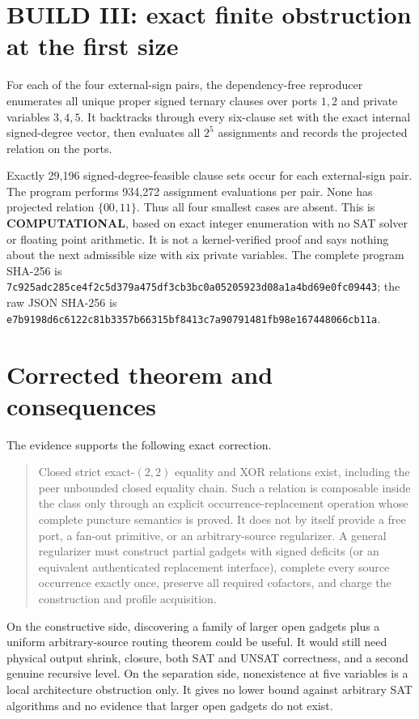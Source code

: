 \documentclass[11pt]{article}
\newcommand{\COMP}{\textbf{COMPUTATIONAL}}
\begin{document}
\section{BUILD III: exact finite obstruction at the first size}
For each of the four external-sign pairs, the dependency-free reproducer
enumerates all unique proper signed ternary clauses over ports $1,2$ and
private variables $3,4,5$. It backtracks through every six-clause set with
the exact internal signed-degree vector, then evaluates all $2^5$ assignments
and records the projected relation on the ports.

Exactly 29,196 signed-degree-feasible clause sets occur for each external-sign
pair. The program performs 934,272 assignment evaluations per pair. None has
projected relation $\{00,11\}$. Thus all four smallest cases are absent. This
is \COMP, based on exact integer enumeration with no SAT solver or floating
point arithmetic. It is not a kernel-verified proof and says nothing about the
next admissible size with six private variables. The complete program SHA-256
is \texttt{7c925adc285ce4f2c5d379a475df3cb3bc0a05205923d08a1a4bd69e0fc09443};
the raw JSON SHA-256 is
\texttt{e7b9198d6c6122c81b3357b66315bf8413c7a90791481fb98e167448066cb11a}.

\section{Corrected theorem and consequences}
The evidence supports the following exact correction.
\begin{quote}
Closed strict exact-$(2,2)$ equality and XOR relations exist, including the
peer unbounded closed equality chain. Such a relation is composable inside
the class only through an explicit occurrence-replacement operation whose
complete puncture semantics is proved. It does not by itself provide a free
port, a fan-out primitive, or an arbitrary-source regularizer. A general
regularizer must construct partial gadgets with signed deficits (or an
equivalent authenticated replacement interface), complete every source
occurrence exactly once, preserve all required cofactors, and charge the
construction and profile acquisition.
\end{quote}

On the constructive side, discovering a family of larger open gadgets plus a
uniform arbitrary-source routing theorem could be useful. It would still need
physical output shrink, closure, both SAT and UNSAT correctness, and a second
genuine recursive level. On the separation side, nonexistence at five
variables is a local architecture obstruction only. It gives no lower bound
against arbitrary SAT algorithms and no evidence that larger open gadgets do
not exist.
\end{document}
